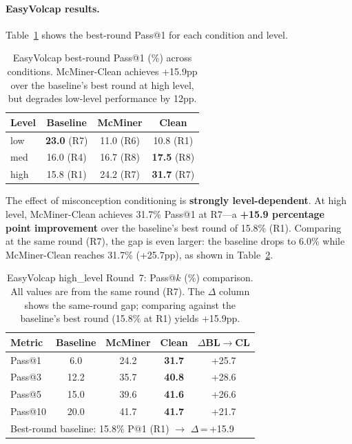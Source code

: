\documentclass[11pt]{article}
\begin{document}
\paragraph{EasyVolcap results.} Table~\ref{tab:mcminer-easyvolcap} shows the best-round Pass@1 for each condition and level.

\begin{table}[t]
  \centering
  \small
  \begin{tabular}{lccc}
    \toprule
    \textbf{Level} & \textbf{Baseline} & \textbf{McMiner} & \textbf{Clean} \\
    \midrule
    low  & \textbf{23.0} (R7) & 11.0 (R6) & 10.8 (R1) \\
    med  & 16.0 (R4) & 16.7 (R8) & \textbf{17.5} (R8) \\
    high & 15.8 (R1) & 24.2 (R7) & \textbf{31.7} (R7) \\
    \bottomrule
  \end{tabular}
  \caption{EasyVolcap best-round Pass@1 (\%) across conditions. McMiner-Clean achieves +15.9pp over the baseline's best round at high level, but degrades low-level performance by 12pp.}
  \label{tab:mcminer-easyvolcap}
\end{table}

The effect of misconception conditioning is \textbf{strongly level-dependent}. At high level, McMiner-Clean achieves 31.7\% Pass@1 at R7---a \textbf{+15.9 percentage point improvement} over the baseline's best round of 15.8\% (R1). Comparing at the same round (R7), the gap is even larger: the baseline drops to 6.0\% while McMiner-Clean reaches 31.7\% (+25.7pp), as shown in Table~\ref{tab:mcminer-headline}.

\begin{table}[t]
  \centering
  \small
  \begin{tabular}{lcccc}
    \toprule
    \textbf{Metric} & \textbf{Baseline} & \textbf{McMiner} & \textbf{Clean} & \textbf{$\Delta$BL$\rightarrow$CL} \\
    \midrule
    Pass@1  & 6.0  & 24.2 & \textbf{31.7} & +25.7 \\
    Pass@3  & 12.2 & 35.7 & \textbf{40.8} & +28.6 \\
    Pass@5  & 15.0 & 39.6 & \textbf{41.6} & +26.6 \\
    Pass@10 & 20.0 & 41.7 & \textbf{41.7} & +21.7 \\
    \midrule
    \multicolumn{5}{l}{\footnotesize Best-round baseline: 15.8\% P@1 (R1) $\rightarrow$ $\Delta$\,=\,+15.9} \\
    \bottomrule
  \end{tabular}
  \caption{EasyVolcap high\_level Round~7: Pass@$k$ (\%) comparison. All values are from the same round (R7). The $\Delta$ column shows the same-round gap; comparing against the baseline's best round (15.8\% at R1) yields +15.9pp.}
  \label{tab:mcminer-headline}
\end{table}
\end{document}

